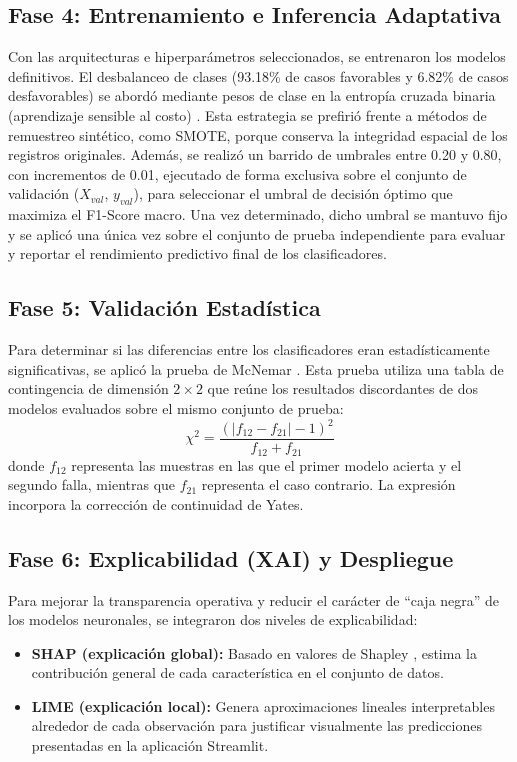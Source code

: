 \documentclass[conference]{IEEEtran}
\begin{document}
\subsection{Fase 4: Entrenamiento e Inferencia Adaptativa}
Con las arquitecturas e hiperparámetros seleccionados, se entrenaron los modelos definitivos. El desbalanceo de clases (93.18\% de casos favorables y 6.82\% de casos desfavorables) se abordó mediante pesos de clase en la entropía cruzada binaria (aprendizaje sensible al costo) \cite{ling2008cost}. Esta estrategia se prefirió frente a métodos de remuestreo sintético, como SMOTE, porque conserva la integridad espacial de los registros originales. Además, se realizó un barrido de umbrales entre 0.20 y 0.80, con incrementos de 0.01, ejecutado de forma exclusiva sobre el conjunto de validación ($X_{val}$, $y_{val}$), para seleccionar el umbral de decisión óptimo que maximiza el F1-Score macro. Una vez determinado, dicho umbral se mantuvo fijo y se aplicó una única vez sobre el conjunto de prueba independiente para evaluar y reportar el rendimiento predictivo final de los clasificadores.

\subsection{Fase 5: Validación Estadística}
Para determinar si las diferencias entre los clasificadores eran estadísticamente significativas, se aplicó la prueba de McNemar \cite{mcnemar1947note}. Esta prueba utiliza una tabla de contingencia de dimensión $2\times2$ que reúne los resultados discordantes de dos modelos evaluados sobre el mismo conjunto de prueba:
\begin{equation}
\chi^2 = \frac{(|f_{12} - f_{21}| - 1)^2}{f_{12} + f_{21}}
\label{eq:mcnemar}
\end{equation}
donde $f_{12}$ representa las muestras en las que el primer modelo acierta y el segundo falla, mientras que $f_{21}$ representa el caso contrario. La expresión incorpora la corrección de continuidad de Yates.

\subsection{Fase 6: Explicabilidad (XAI) y Despliegue}
Para mejorar la transparencia operativa y reducir el carácter de ``caja negra'' de los modelos neuronales, se integraron dos niveles de explicabilidad:
\begin{itemize}
    \item \textbf{SHAP (explicación global):} Basado en valores de Shapley \cite{lundberg2017unified}, estima la contribución general de cada característica en el conjunto de datos.
    \item \textbf{LIME (explicación local):} Genera aproximaciones lineales interpretables alrededor de cada observación \cite{ribeiro2016why} para justificar visualmente las predicciones presentadas en la aplicación Streamlit.
\end{itemize}
\end{document}
